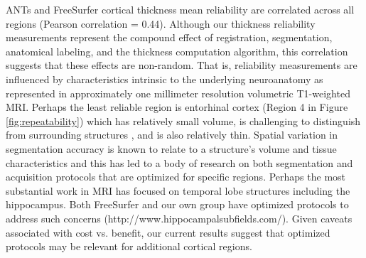 ANTs and FreeSurfer cortical thickness mean reliability
      are correlated across all regions (Pearson correlation = 0.44).
      Although our thickness reliability measurements represent the
      compound effect of registration, segmentation, anatomical
      labeling, and the thickness computation algorithm, this
      correlation suggests that these effects are non-random.  That
      is, reliability measurements are influenced by characteristics
      intrinsic to the underlying neuroanatomy as represented in
      approximately one millimeter resolution volumetric T1-weighted
      MRI.   Perhaps the least reliable region is entorhinal cortex
      (Region 4 in Figure \ref{fig:repeatability}) which has
      relatively small volume, is challenging to distinguish from surrounding structures
\citep{price2010}, and is also relatively thin.  Spatial variation in segmentation accuracy is known to relate to a structure's volume and tissue characteristics and this has led to a body of research on both segmentation and acquisition protocols that are optimized for specific regions.  Perhaps the most substantial work in MRI has focused on temporal lobe structures including the hippocampus.  Both FreeSurfer and our own group have optimized protocols to address such concerns (http://www.hippocampalsubfields.com/).  Given caveats associated with cost vs. benefit, our current results suggest that optimized protocols may be relevant for additional cortical regions.




